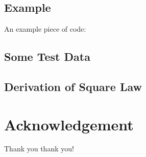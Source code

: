\documentclass{senior-design}
\begin{document}
\begin{appendices}
\section{Example}
An example piece of code:


\subsection{Some Test Data}

\subsection{Derivation of Square Law}
\end{appendices}
\clearpage

\section*{Acknowledgement}
Thank you thank you!
\end{document}
